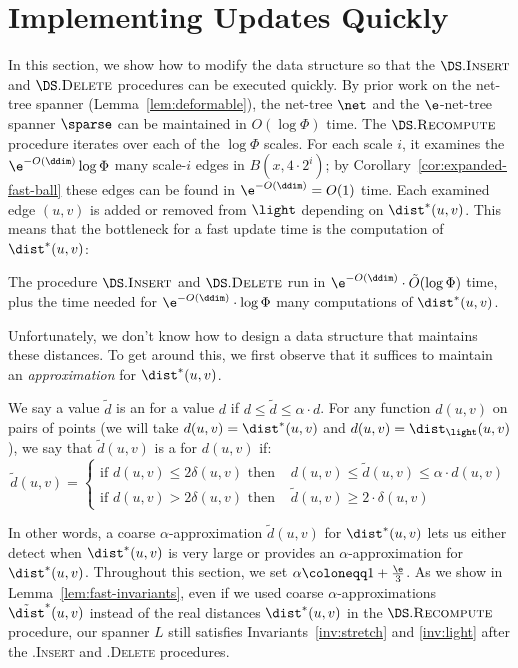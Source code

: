 \section{Implementing Updates Quickly}
\label{S:distance-oracle}
%
In this section, we show how to modify the data structure so that the $\DS.\textsc{Insert}$ and $\DS.\textsc{Delete}$ procedures can be executed quickly. By prior work on the net-tree spanner (Lemma~\ref{lem:deformable}), the net-tree $\net$ and the $\e$-net-tree spanner $\sparse$ can be maintained in $O(\log \Phi)$ time. The $\DS.\textsc{Recompute}$ procedure iterates over each of the $\log \Phi$ scales. For each scale $i$, it examines the $\e^{-O(\ddim)} \log \Phi$ many scale-$i$ edges in $B(x,4 \cdot 2^i)$; by Corollary~\ref{cor:expanded-fast-ball} these edges can be found in $\e^{-O(\ddim)} = O(1)$ time. 
Each examined edge $(u,v)$ is added or removed from $\light$ depending on $\dist^*(u,v)$. This means that the bottleneck for a fast update time is the computation of $\dist^*(u,v)$:
%
\begin{lemma}
\label{lem:basic-runtime}
    The procedure $\DS.\textsc{Insert}$ and $\DS.\textsc{Delete}$ run in $\e^{-O(\ddim)} \cdot\tilde O (\log \Phi)$ time, plus the time needed for $\e^{-O(\ddim)} \cdot \log \Phi$ many computations of $\dist^*(u,v)$.
\end{lemma}
%
Unfortunately, we don't know how to design a data structure that maintains these distances. To get around this, we first observe that it suffices to maintain an \emph{approximation} for $\dist^*(u,v)$. 
%
%
\begin{definition}
We say a value $\tilde d$ is an  for a value $d$ if $d \le \tilde d \le \alpha \cdot d$.
     For any function $d(u,v)$ on pairs of points (we will take $d(u,v) = \dist^*(u,v)$ and $d(u,v) = \dist_{\light}(u,v)$), we say that $\tilde d(u,v)$ is a  for $d(u,v)$ if:
     \[
\tilde{d}(u,v)=\begin{cases}
\text{if }d(u,v)\le2\delta(u,v)\text{ then } & d(u,v)\le\tilde{d}(u,v)\le\alpha\cdot d(u,v)\\
\text{if }d(u,v)>2\delta(u,v)\text{ then } & \tilde{d}(u,v)\ge2\cdot\delta(u,v)
\end{cases}
\]
\end{definition}
In other words, a coarse $\alpha$-approximation $\tilde d(u,v)$ for $\dist^*(u,v)$ lets us either detect when $\dist^*(u,v)$ is very large or provides an $\alpha$-approximation for $\dist^*(u,v)$. Throughout this section, we set $\alpha \coloneqq 1 + \frac \e 3$. As we show in Lemma~\ref{lem:fast-invariants}, even if we used coarse $\alpha$-approximations $\tilde \dist^*(u,v)$ instead of the real distances $\dist^*(u,v)$ in the $\DS.\textsc{Recompute}$ procedure, our spanner $L$ still satisfies Invariants~\ref{inv:stretch} and \ref{inv:light} after the \DS.\textsc{Insert} and \DS.\textsc{Delete} procedures.
%
%
